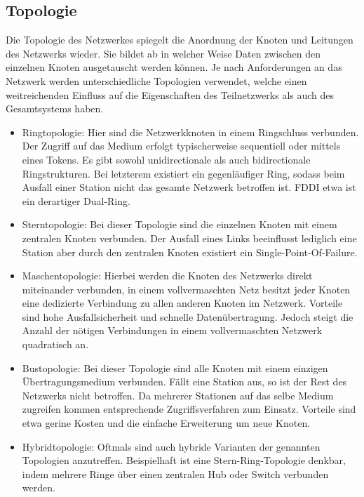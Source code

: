     \subsection{Topologie}
    Die Topologie des Netzwerkes spiegelt die Anordnung der Knoten und Leitungen des Netzwerks wieder. Sie bildet ab in welcher Weise Daten zwischen
    den einzelnen Knoten ausgetauscht werden können. Je nach Anforderungen an das Netzwerk werden unterschiedliche Topologien verwendet,
    welche einen weitreichenden Einfluss auf die Eigenschaften des Teilnetzwerks als auch des Gesamtsystems haben.
        \begin{itemize}
            \item Ringtopologie: Hier sind die Netzwerkknoten in einem Ringschluss verbunden. Der Zugriff auf das Medium erfolgt typischerweise sequentiell 
            oder mittels eines Tokens. Es gibt sowohl unidirectionale als auch bidirectionale Ringstrukturen. Bei letzterem existiert ein gegenläufiger Ring, 
            sodass beim Ausfall einer Station nicht das gesamte Netzwerk betroffen ist. FDDI etwa ist ein derartiger Dual-Ring.
            \item Sterntopologie: Bei dieser Topologie sind die einzelnen Knoten mit einem zentralen Knoten verbunden. Der Ausfall eines Links beeinflusst lediglich
            eine Station aber durch den zentralen Knoten existiert ein Single-Point-Of-Failure. 
            \item Maschentopologie: Hierbei werden die Knoten des Netzwerks direkt miteinander verbunden, in einem vollvermaschten Netz besitzt jeder Knoten eine 
            dedizierte Verbindung zu allen anderen Knoten im Netzwerk. Vorteile sind hohe Ausfallsicherheit und schnelle Datenübertragung. Jedoch steigt die Anzahl der 
            nötigen Verbindungen in einem vollvermaschten Netzwerk quadratisch an.
            \item Bustopologie: Bei dieser Topologie sind alle Knoten mit einem einzigen Übertragungsmedium verbunden. Fällt eine Station aus, so ist der Rest des Netzwerks
            nicht betroffen. Da mehrerer Stationen auf das selbe Medium zugreifen kommen entsprechende Zugriffsverfahren zum Einsatz. Vorteile sind etwa gerine Kosten und die
            einfache Erweiterung um neue Knoten.
            \item Hybridtopologie: Oftmals sind auch hybride Varianten der genannten Topologien anzutreffen. Beispielhaft ist eine Stern-Ring-Topologie denkbar, indem
            mehrere Ringe über einen zentralen Hub oder Switch verbunden werden.
        \end{itemize}
